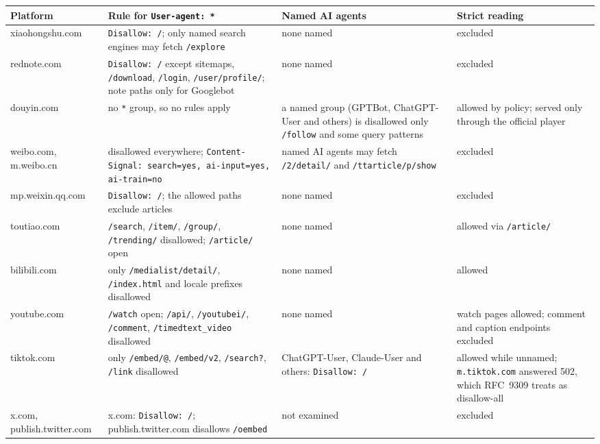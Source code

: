 \documentclass[11pt]{article}
\begin{document}
\begin{center}\begin{minipage}{\textwidth}\centering\small
{}
\label{tab:robots}
\begin{tabular}{@{}>{\raggedright\arraybackslash}p{2.85cm} >{\raggedright\arraybackslash}p{5.0cm} >{\raggedright\arraybackslash}p{3.6cm} >{\raggedright\arraybackslash}p{2.75cm}@{}}
\toprule
Platform & Rule for \texttt{User-agent: *} & Named AI agents & Strict reading \\
\midrule
xiaohongshu.com \citep{robots2026xiaohongshu} & \texttt{Disallow: /}; only named search engines may fetch
  \texttt{/explore} & none named & excluded \\
rednote.com \citep{robots2026rednote} & \texttt{Disallow: /} except sitemaps, \texttt{/download},
  \texttt{/login}, \texttt{/user/profile/}; note paths only for Googlebot & none named & excluded \\
douyin.com \citep{robots2026douyin} & no \texttt{*} group, so no rules apply & a named group (GPTBot,
  ChatGPT-User and others) is disallowed only \texttt{/follow} and some query patterns & allowed by policy;
  served only through the official player \\
weibo.com, m.weibo.cn \citep{robots2026weibo} & disallowed everywhere; \texttt{Content-Signal: search=yes,
  ai-input=yes, ai-train=no} & named AI agents may fetch \texttt{/2/detail/} and \texttt{/ttarticle/p/show} &
  excluded \\
mp.weixin.qq.com \citep{robots2026weixin} & \texttt{Disallow: /}; the allowed paths exclude articles & none
  named & excluded \\
toutiao.com \citep{robots2026toutiao} & \texttt{/search}, \texttt{/item/}, \texttt{/group/},
  \texttt{/trending/} disallowed; \texttt{/article/} open & none named & allowed via \texttt{/article/} \\
bilibili.com \citep{robots2026bilibili} & only \texttt{/medialist/detail/}, \texttt{/index.html} and locale
  prefixes disallowed & none named & allowed \\
youtube.com \citep{robots2026youtube} & \texttt{/watch} open; \texttt{/api/}, \texttt{/youtubei/},
  \texttt{/comment}, \texttt{/timedtext\_video} disallowed & none named & watch pages allowed; comment and
  caption endpoints excluded \\
tiktok.com \citep{robots2026tiktok} & only \texttt{/embed/@}, \texttt{/embed/v2}, \texttt{/search?},
  \texttt{/link} disallowed & ChatGPT-User, Claude-User and others: \texttt{Disallow: /} & allowed while
  unnamed; \texttt{m.tiktok.com} answered 502, which RFC~9309 treats as disallow-all \\
x.com, publish.twitter.com & x.com: \texttt{Disallow: /}; publish.twitter.com disallows \texttt{/oembed} & not
  examined & excluded \\
\bottomrule
\end{tabular}
\end{minipage}\end{center}
\end{document}
